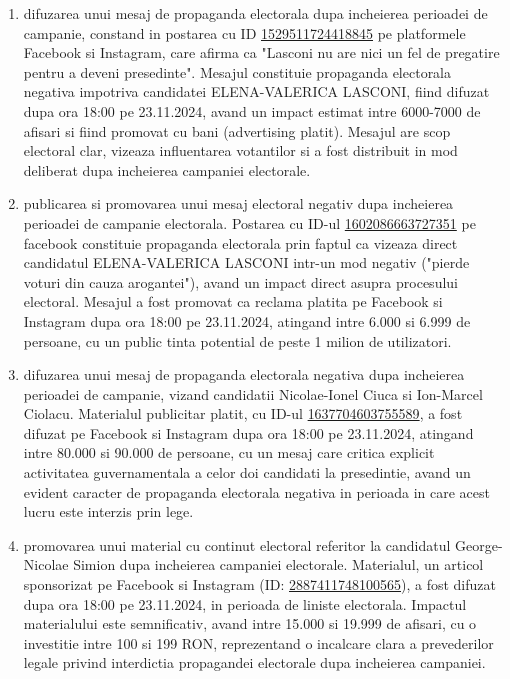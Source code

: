 \documentclass[a4paper,12pt]{article}
\begin{document}
\begin{enumerate}[leftmargin=*, label=\arabic*.)]
    \item difuzarea unui mesaj de propaganda electorala dupa incheierea perioadei de campanie, constand in postarea cu ID \href{https://www.facebook.com/ads/library/?id=1529511724418845}{1529511724418845} pe platformele Facebook si Instagram, care afirma ca "Lasconi nu are nici un fel de pregatire pentru a deveni presedinte". Mesajul constituie propaganda electorala negativa impotriva candidatei ELENA-VALERICA LASCONI, fiind difuzat dupa ora 18:00 pe 23.11.2024, avand un impact estimat intre 6000-7000 de afisari si fiind promovat cu bani (advertising platit). Mesajul are scop electoral clar, vizeaza influentarea votantilor si a fost distribuit in mod deliberat dupa incheierea campaniei electorale.
    \item publicarea si promovarea unui mesaj electoral negativ dupa incheierea perioadei de campanie electorala. Postarea cu ID-ul \href{https://www.facebook.com/ads/library/?id=1602086663727351}{1602086663727351} pe facebook constituie propaganda electorala prin faptul ca vizeaza direct candidatul ELENA-VALERICA LASCONI intr-un mod negativ ("pierde voturi din cauza arogantei"), avand un impact direct asupra procesului electoral. Mesajul a fost promovat ca reclama platita pe Facebook si Instagram dupa ora 18:00 pe 23.11.2024, atingand intre 6.000 si 6.999 de persoane, cu un public tinta potential de peste 1 milion de utilizatori.
    \item difuzarea unui mesaj de propaganda electorala negativa dupa incheierea perioadei de campanie, vizand candidatii Nicolae-Ionel Ciuca si Ion-Marcel Ciolacu. Materialul publicitar platit, cu ID-ul \href{https://www.facebook.com/ads/library/?id=1637704603755589}{1637704603755589}, a fost difuzat pe Facebook si Instagram dupa ora 18:00 pe 23.11.2024, atingand intre 80.000 si 90.000 de persoane, cu un mesaj care critica explicit activitatea guvernamentala a celor doi candidati la presedintie, avand un evident caracter de propaganda electorala negativa in perioada in care acest lucru este interzis prin lege.
    \item promovarea unui material cu continut electoral referitor la candidatul George-Nicolae Simion dupa incheierea campaniei electorale. Materialul, un articol sponsorizat pe Facebook si Instagram (ID: \href{https://www.facebook.com/ads/library/?id=2887411748100565}{2887411748100565}), a fost difuzat dupa ora 18:00 pe 23.11.2024, in perioada de liniste electorala. Impactul materialului este semnificativ, avand intre 15.000 si 19.999 de afisari, cu o investitie intre 100 si 199 RON, reprezentand o incalcare clara a prevederilor legale privind interdictia propagandei electorale dupa incheierea campaniei.

\end{enumerate}
\end{document}
